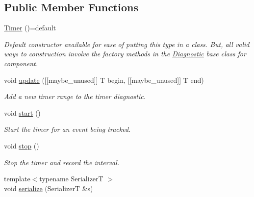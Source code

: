 \subsection*{Public Member Functions}
\begin{DoxyCompactItemize}
\item 
\hyperlink{structvt_1_1runtime_1_1component_1_1meter_1_1_timer_af32ee3397a43cd6af675904d70295211}{Timer} ()=default
\begin{DoxyCompactList}\small\item\em Default constructor available for ease of putting this type in a class. But, all valid ways to construction involve the factory methods in the {\ttfamily \hyperlink{structvt_1_1runtime_1_1component_1_1_diagnostic}{Diagnostic}} base class for component. \end{DoxyCompactList}\item 
void \hyperlink{structvt_1_1runtime_1_1component_1_1meter_1_1_timer_a08cb46fd118ffa75e56f08f575dbda6b}{update} (\mbox{[}\mbox{[}maybe\+\_\+unused\mbox{]}\mbox{]} T begin, \mbox{[}\mbox{[}maybe\+\_\+unused\mbox{]}\mbox{]} T end)
\begin{DoxyCompactList}\small\item\em Add a new timer range to the timer diagnostic. \end{DoxyCompactList}\item 
void \hyperlink{structvt_1_1runtime_1_1component_1_1meter_1_1_timer_a685bd06e9e97de01cf8948dec7d59462}{start} ()
\begin{DoxyCompactList}\small\item\em Start the timer for an event being tracked. \end{DoxyCompactList}\item 
void \hyperlink{structvt_1_1runtime_1_1component_1_1meter_1_1_timer_a302a9e413a1188b3a30ece1905123249}{stop} ()
\begin{DoxyCompactList}\small\item\em Stop the timer and record the interval. \end{DoxyCompactList}\item 
{\footnotesize template$<$typename SerializerT $>$ }\\void \hyperlink{structvt_1_1runtime_1_1component_1_1meter_1_1_timer_a4462112eaf78f9dec18de88d9c4c93f4}{serialize} (SerializerT \&s)
\end{DoxyCompactItemize}
